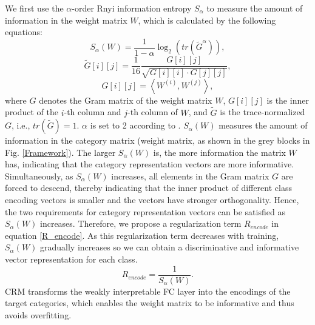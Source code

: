 \documentclass[letterpaper]{article}
\begin{document}
	We first use the $\alpha$-order Rnyi information entropy $S_\alpha$ to measure the amount of information in the weight matrix $W$, which is calculated by the following equations:
	\begin{equation}
		\label{S_alpha}
		{S_\alpha }(W) = \frac{1}{{1 - \alpha }}{\log _2}(tr({\tilde G^\alpha })),
	\end{equation}
	\begin{equation}
		\label{G tilde}
		\tilde G[i][j] = \frac{1}{{16}}\frac{{G[i][j]}}{{\sqrt {G[i][i] \cdot G[j][j]} }},
	\end{equation}
	\begin{equation}
		\label{G}
		G[i][j] = \left\langle {{W^{(i)}},{W^{(j)}}} \right\rangle,
	\end{equation}
	where $G$ denotes the Gram matrix of the weight matrix $W$, $G[i][j]$ is the inner product of the $i$-th column and $j$-th column of $W$, and $\tilde G$ is the trace-normalized $G$, i.e., $tr(\tilde G)=1$. $\alpha$ is set to 2 according to \cite{8787866, 8998186}.
	${S_\alpha}(W)$ measures the amount of information in the category matrix (weight matrix, as shown in the grey blocks in Fig. \ref{Framework}). The larger ${S_\alpha}(W)$ is, the more information the matrix $W$ has, indicating that the category representation vectors are more informative. Simultaneously, as ${S_\alpha}(W)$ increases, all elements in the Gram matrix $G$ are forced to descend, thereby indicating that the inner product of different class encoding vectors is smaller and the vectors have stronger orthogonality. Hence, the two requirements for category representation vectors can be satisfied as ${S_\alpha}(W)$ increases. Therefore, we propose a regularization term $R_{encode}$ in equation \ref{R_encode}. As this regularization term decreases with training, ${S_\alpha}(W)$ gradually increases so we can obtain a discriminative and informative vector representation for each class.
	\begin{equation}
		\label{R_encode}
		{R_{encode}} = \frac{1}{{{S_\alpha}(W)}}.
	\end{equation}
	CRM transforms the weakly interpretable FC layer into the encodings of the target categories, which enables the weight matrix to be informative and thus avoids overfitting.
\end{document}
